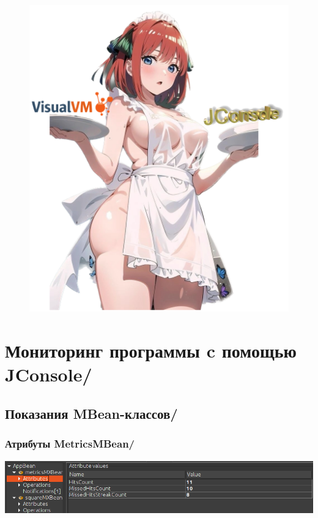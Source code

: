 \newpage

\thispagestyle{empty}

\BgThispage

\begin{figure}[H]
    \centering
    \includegraphics[scale=0.5]{img/трахать}
\end{figure}

\newpage

\thispagestyle{empty}

\BgThispage


\section{Мониторинг программы c помощью JConsole/}

\subsection{Показания MBean-классов/}

\subsubsection{Атрибуты MetricsMBean/}
\includegraphics[scale=0.5]{img/Ex2pics/MetricAttributes}


